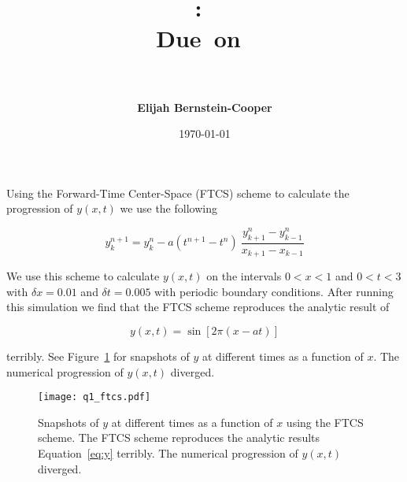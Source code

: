 \documentclass{article}
\title{\vspace{2in}
    \textmd{\textbf{\hmwkClass:\ \hmwkTitle}}\\
    \normalsize\vspace{0.1in}\small{Due\ on\ \hmwkDueDate}\\
    \vspace{0.1in}\large{\textit{\hmwkClassInstructor\ \hmwkClassTime}}
    \vspace{3in}}
\author{\textbf{Elijah Bernstein-Cooper}}
\date{\today} %
\begin{document}
\maketitle
\newpage

\begin{homeworkProblem}

    Using the Forward-Time Center-Space (FTCS) scheme to calculate the
    progression of $y(x,t)$ we use the following

    \begin{equation}
        y^{n+1}_k = y^n_k - a(t^{n+1} - t^{n})  \
        \frac{y^n_{k+1} - y^n_{k-1}}{x_{k+1} - x_{k-1}}
    \end{equation}
   
    We use this scheme to calculate $y(x,t)$ on the intervals $0 < x < 1$ and
    $0 < t < 3$ with $\delta x = 0.01$ and $\delta t = 0.005$ with periodic
    boundary conditions. After running this simulation we find that the FTCS
    scheme reproduces the analytic result of 
    
    \begin{equation} \label{eq:y}
        y(x,t) = \sin[2 \pi (x-at)] 
    \end{equation}
    
    \noindent terribly. See Figure~\ref{fig:ftcs} for snapshots of $y$ at
    different times as a function of $x$. The numerical progression of $y(x,t)$
    diverged.

    \begin{figure}[!ht]
    \begin{center}
        \texttt{[image: q1\_ftcs.pdf]} 

        \caption{\label{fig:ftcs} Snapshots of $y$ at different times as a
        function of $x$ using the FTCS scheme. The FTCS scheme reproduces the
        analytic results Equation~\ref{eq:y} terribly. The numerical
        progression of $y(x,t)$ diverged.}

    \end{center}
    \end{figure}

\end{homeworkProblem}
\clearpage
\end{document}
